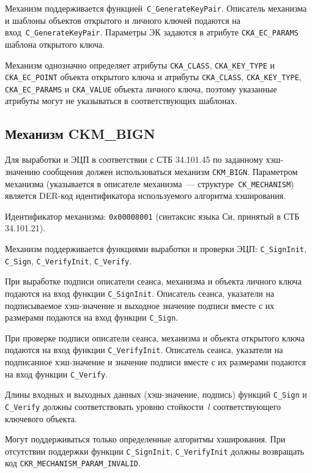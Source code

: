 Механизм поддерживается функцией~\verb|C_GenerateKeyPair|. 
%
Описатель механизма и шаблоны объектов открытого и личного
ключей подаются на вход~\verb|C_GenerateKeyPair|. Параметры ЭК задаются в 
атрибуте \verb|CKA_EC_PARAMS| шаблона открытого ключа.

Механизм однозначно определяет атрибуты 
\verb|CKA_CLASS|, \verb|CKA_KEY_TYPE| и \verb|CKA_EC_POINT|
объекта открытого ключа и атрибуты
\verb|CKA_CLASS|, \verb|CKA_KEY_TYPE|, \verb|CKA_EC_PARAMS| и 
\verb|CKA_VALUE| объекта личного ключа,
поэтому указанные атрибуты могут не указываться в
соответствующих шаблонах.

\subsection{Механизм CKM\_BIGN}\label{CRYPTOKI.SignHSpec}

Для выработки и  ЭЦП в соответствии с СТБ 34.101.45 по 
заданному хэш-значению сообщения должен использоваться механизм 
\verb|CKM_BIGN|. 
%
Параметром механизма (указывается в описателе механизма~--- 
структуре~\verb|CK_MECHANISM|) является DER-код идентификатора 
используемого алгоритма хэширования.

Идентификатор механизма: \texttt{0x00008001} 
(синтаксис языка Си, принятый в СТБ 34.101.21). 

Механизм поддерживается функциями выработки и проверки ЭЦП: 
\verb|C_SignInit|, \verb|C_Sign|, \verb|C_VerifyInit|, \verb|C_Verify|.

При выработке подписи описатели сеанса, механизма и объекта
личного ключа подаются на вход функции \verb|C_SignInit|.
Описатель сеанса, указатели на подписываемое хэш-значение и выходное 
значение подписи вместе с их размерами подаются на вход функции 
\verb|C_Sign|.

При проверке подписи описатели сеанса, механизма и объекта
открытого ключа подаются на вход функции \verb|C_VerifyInit|.
Описатель сеанса, указатели на подписанное хэш-значение и значение подписи 
вместе с их размерами подаются на вход функции \verb|C_Verify|.

Длины входных и выходных данных (хэш-значение, подпись) функций
\verb|C_Sign| и \verb|C_Verify| должны соответствовать
уровню стойкости~$l$ соответствующего ключевого объекта.

Могут поддерживаться только определенные алгоритмы хэширования.
При отсутствии поддержки функции \verb|C_SignInit|,
\verb|C_VerifyInit| должны возвращать код 
\verb|CKR_MECHANISM_PARAM_INVALID|.

